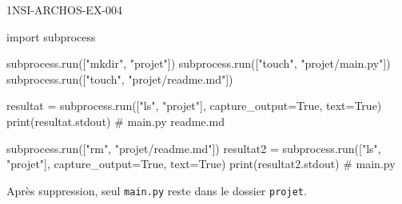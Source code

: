 \begin{corrige}{1NSI-ARCHOS-EX-004}
\begin{python}
import subprocess

subprocess.run(["mkdir", "projet"])
subprocess.run(["touch", "projet/main.py"])
subprocess.run(["touch", "projet/readme.md"])

resultat = subprocess.run(["ls", "projet"], capture_output=True, text=True)
print(resultat.stdout)  # main.py \n readme.md

subprocess.run(["rm", "projet/readme.md"])
resultat2 = subprocess.run(["ls", "projet"], capture_output=True, text=True)
print(resultat2.stdout)  # main.py
\end{python}
Après suppression, seul \lstinline{main.py} reste dans le dossier \lstinline{projet}.
\end{corrige}
